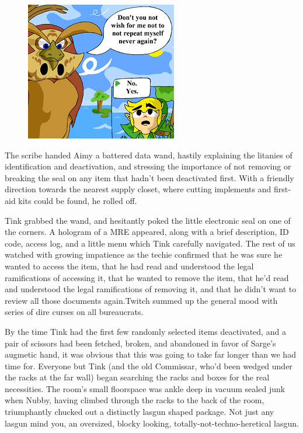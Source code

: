 \begin{figure}
	\begin{center}
		\includegraphics[width=\figwidth]{pics/21/75.png}
	\end{center}
\end{figure}
The scribe handed Aimy a battered data wand, hastily explaining the litanies of identification and deactivation, and stressing the importance of not removing or breaking the seal on any item that hadn't been deactivated first. 
With a friendly direction towards the nearest supply closet, where cutting implements and first-aid kits could be found, he rolled off. 


Tink grabbed the wand, and hesitantly poked the little electronic seal on one of the corners. 
A hologram of a MRE appeared, along with a brief description, ID code, access log, and a little menu which Tink carefully navigated. 
The rest of us watched with growing impatience as the techie confirmed that he was sure he wanted to access the item, that he had read and understood the legal ramifications of accessing it, that he wanted to remove the item, that he'd read and understood the legal ramifications of removing it, and that he didn't want to review all those documents again.Twitch summed up the general mood with series of dire curses on all bureaucrats.

By the time Tink had the first few randomly selected items deactivated, and a pair of scissors had been fetched, broken, and abandoned in favor of Sarge's augmetic hand, it was obvious that this was going to take far longer than we had time for. 
Everyone but Tink (and the old Commissar, who'd been wedged under the racks at the far wall) began searching the racks and boxes for the real necessities. 
The room's small floorspace was ankle deep in vacuum sealed junk when Nubby, having climbed through the racks to the back of the room, triumphantly chucked out a distinctly lasgun shaped package. 
Not just any lasgun mind you, an oversized, blocky looking, totally-not-techno-heretical lasgun. 


